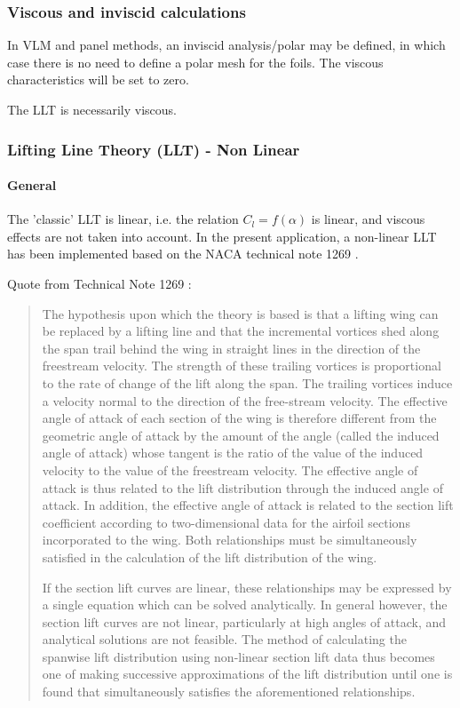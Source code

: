 \documentclass[a4paper,twoside,12pt,dvips]{article}
\begin{document}
\subsubsection{Viscous and inviscid calculations}

In VLM and panel methods, an inviscid analysis/polar may be defined,
in which case there is no need to define a polar mesh for the
foils. The viscous characteristics will be set to zero.

The LLT is necessarily viscous.

\subsubsection{Lifting Line Theory (LLT) - Non Linear}

\paragraph{General}

The 'classic' LLT is linear, i.e. the relation $C_l = f(\alpha)$ is
linear, and viscous effects are not taken into account. In the present
application, a non-linear LLT has been implemented based on the NACA
technical note 1269 \cite{Sivells47}.

Quote from Technical Note 1269 :

\begin{quotation}
The hypothesis upon which the theory is based is that a lifting wing
can be replaced by a lifting line and that the incremental vortices
shed along the span trail behind the wing in straight lines in the
direction of the freestream velocity. The strength of these trailing
vortices is proportional to the rate of change of the lift along the
span. The trailing vortices induce a velocity normal to the direction
of the free-stream velocity. The effective angle of attack of each
section of the wing is therefore different from the geometric angle of
attack by the amount of the angle (called the induced angle of attack)
whose tangent is the ratio of the value of the induced velocity to the
value of the freestream velocity.  The effective angle of attack is
thus related to the lift distribution through the induced angle of
attack. In addition, the effective angle of attack is related to the
section lift coefficient according to two-dimensional data for the
airfoil sections incorporated to the wing.  Both relationships must be
simultaneously satisfied in the calculation of the lift distribution
of the wing.

If the section lift curves are linear, these relationships may be
expressed by a single equation which can be solved analytically. In
general however, the section lift curves are not linear, particularly
at high angles of attack, and analytical solutions are not feasible.
The method of calculating the spanwise lift distribution using
non-linear section lift data thus becomes one of making successive
approximations of the lift distribution until one is found that
simultaneously satisfies the aforementioned relationships.
\end{quotation}
\end{document}
